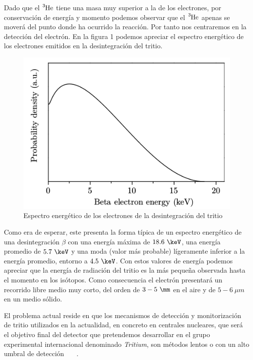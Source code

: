 Dado que el $\ce{^3He}$  tiene una masa muy superior a la de los electrones, por conservación de energía y momento podemos observar que el $\ce{^3He}$  apenas se moverá del punto donde ha ocurrido la reacción. Por tanto nos centraremos en la detección del electrón. En la figura 1 podemos apreciar el espectro energético de los electrones emitidos en la desintegración del tritio.

\begin{figure}[hbtp]
\includegraphics[scale=0.6]{Espectro.png}
\centering
\caption{Espectro energético de los electrones de la desintegración del tritio ~\cite{TesisTritio}\label{Espectrotritio}}
\end{figure}

Como era de esperar, este presenta la forma típica de un espectro energético de una desintegración $\beta$ con una energía máxima de $18.6~\keV$, una energía promedio de $5.7~\keV$ y una moda (valor más probable) lígeramente inferior a la energía promedio, entorno a $4.5~\keV$. Con estos valores de energía podemos apreciar que la energía de radiación del tritio es la más pequeña observada hasta el momento en los isótopos. Como consecuencia el electrón presentará un recorrido libre medio muy corto, del orden de $3-5~\mm$ en el aire y de $5-6~\mu m$ en un medio sólido.

El problema actual reside en que los mecanismos de detección y monitorización de tritio utilizados en la actualidad, en concreto en centrales nucleares, que será el objetivo final del detector que pretendemos desarrollar en el grupo experimental internacional denominado \textit{Tritium}, son métodos lentos o con un alto umbral de detección ~\cite{limiteMB}~\cite{Limitetiempo}~\cite{Limite}. 

